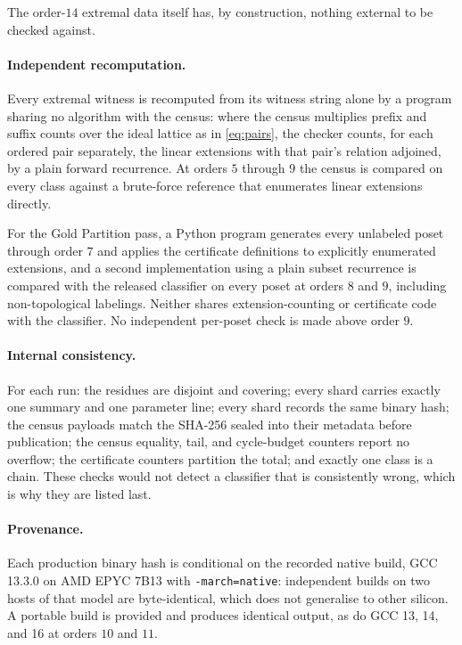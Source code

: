 \documentclass[11pt]{article}
\theoremstyle{definition}
\begin{document}
The order-$14$ extremal data itself has, by construction, nothing external to
be checked against.

\paragraph{Independent recomputation.}
Every extremal witness is recomputed from its witness string alone by a
program sharing no algorithm with the census: where the census multiplies
prefix and suffix counts over the ideal lattice as in \eqref{eq:pairs}, the
checker counts, for each ordered pair separately, the linear extensions with
that pair's relation adjoined, by a plain forward recurrence.  At orders $5$
through $9$ the census is compared on every class against a brute-force
reference that enumerates linear extensions directly.

For the Gold Partition pass, a Python program generates every unlabeled poset
through order $7$ and applies the certificate definitions to explicitly
enumerated extensions, and a second implementation using a plain subset
recurrence is compared with the released classifier on every poset at orders
$8$ and $9$, including non-topological labelings.  Neither shares
extension-counting or certificate code with the classifier.  No independent
per-poset check is made above order $9$.

\paragraph{Internal consistency.}
For each run: the residues are disjoint and covering; every shard carries
exactly one summary and one parameter line; every shard records the same
binary hash; the census payloads match the SHA-256 sealed into their metadata
before publication; the census equality, tail, and cycle-budget counters report
no overflow; the certificate counters partition the total; and exactly one
class is a chain.  These checks would not detect a classifier that is
consistently wrong, which is why they are listed last.

\paragraph{Provenance.}
Each production binary hash is conditional on the recorded native build, GCC
13.3.0 on AMD EPYC 7B13 with \texttt{-march=native}: independent builds on two
hosts of that model are byte-identical, which does not generalise to other
silicon.  A portable build is provided and produces identical output, as do
GCC 13, 14, and 16 at orders $10$ and $11$.
\end{document}
